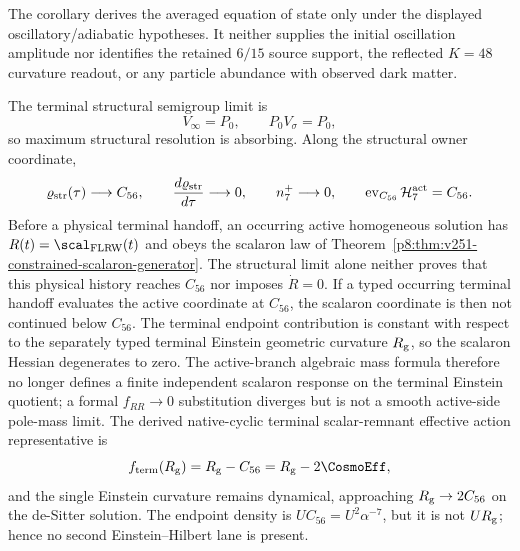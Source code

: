 \documentclass[12pt,a4paper]{article}
\begin{document}
\begin{remark}
The corollary derives the averaged equation of state only under the displayed
oscillatory/adiabatic hypotheses.  It neither supplies the initial oscillation
amplitude nor identifies the retained \(6/15\) source support, the reflected
\(K=48\) curvature readout, or any particle abundance with observed dark
matter.
\end{remark}

\begin{theorem}
\label{p8:thm:absorbing-spectral-handoff}
The terminal structural semigroup limit is
\[
V_\infty=P_0,
\qquad
P_0V_\sigma=P_0,
\]
so maximum structural resolution is absorbing.  Along the structural owner
coordinate,
\[
 \varrho_{\rm str}(\tau)\longrightarrow C_{56},
 \qquad
 \frac{d\varrho_{\rm str}}{d\tau}\longrightarrow0,
 \qquad
 n_7^+\longrightarrow0,
 \qquad
 \operatorname{ev}_{C_{56}}\mathcal H_7^{\rm act}=C_{56}.
\]
Before a physical terminal handoff, an occurring active homogeneous solution
has \(R(t)=\scal_{\rm FLRW}(t)\) and obeys the scalaron law of
Theorem~\ref{p8:thm:v251-constrained-scalaron-generator}.  The structural
limit alone neither proves that this physical history reaches \(C_{56}\) nor
imposes \(\dot R=0\).  If a typed occurring terminal handoff evaluates the
active coordinate at \(C_{56}\), the scalaron coordinate is then not continued
below \(C_{56}\).  The
terminal endpoint contribution is constant with respect to the separately
typed terminal Einstein geometric curvature \(R_{\rm g}\), so the scalaron Hessian
degenerates to zero.  The active-branch algebraic mass formula therefore no longer
defines a finite independent scalaron response on the terminal Einstein quotient;
a formal \(f_{RR}\to0\) substitution diverges but is not a smooth active-side
pole-mass limit.  The derived native-cyclic terminal scalar-remnant effective action representative is
\begin{equation}
\label{p8:eq:dark-energy-readout-low-curvature}
 f_{\rm term}(R_{\rm g})
 =R_{\rm g}-C_{56}
 =R_{\rm g}-2\CosmoEff,
\end{equation}
and the single Einstein curvature remains dynamical, approaching
\(R_{\rm g}\to2C_{56}\) on the de-Sitter solution.  The endpoint density is
\(U C_{56}=U^2\alpha^{-7}\), but it is not
\(U R_{\rm g}\); hence no second Einstein--Hilbert lane is present.
\end{theorem}
\end{document}
